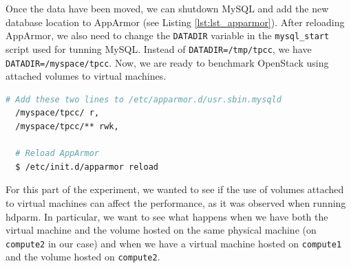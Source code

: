 Once the data have been moved, we can shutdown MySQL and add the new database location to AppArmor (see Listing \ref{lst:lst_apparmor}). 
After reloading AppArmor, we also need to change the \texttt{DATADIR} variable in the \texttt{mysql\_start} script used for tunning MySQL. 
Instead of \texttt{DATADIR=/tmp/tpcc}, we have \texttt{DATADIR=/myspace/tpcc}. 
Now, we are ready to benchmark OpenStack using attached volumes to virtual machines.

{
\singlespacing
\begin{lstlisting}[frame=single,language=bash,caption={Configure AppArmor},label={lst:lst_apparmor}]
  # Add these two lines to /etc/apparmor.d/usr.sbin.mysqld
  /myspace/tpcc/ r,
  /myspace/tpcc/** rwk,

  # Reload AppArmor
  $ /etc/init.d/apparmor reload
\end{lstlisting}
}

For this part of the experiment, we wanted to see if the use of volumes attached to virtual machines can affect the performance, as it was observed when running hdparm. 
In particular, we want to see what happens when we have both the virtual machine and the volume hosted on the same physical machine (on \texttt{compute2} in our case) and when we have a virtual machine hosted on \texttt{compute1} and the volume hosted on \texttt{compute2}.

